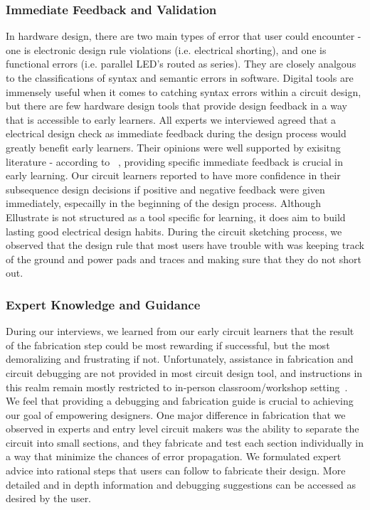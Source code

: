 \documentclass{sigchi}
\begin{document}
\subsubsection{Immediate Feedback and Validation}
In hardware design, there are two main types of error that user could encounter - one is electronic design rule violations (i.e. electrical shorting), and one is functional errors (i.e. parallel LED's routed as series). They are closely analgous to the classifications of syntax and semantic errors in software. Digital tools are immensely useful when it comes to catching syntax errors within a circuit design, but there are few hardware design tools that provide design feedback in a way that is accessible to early learners. All experts we interviewed agreed that a electrical design check as immediate feedback during the design process would greatly benefit early learners. Their opinions were well supported by exisitng literature - according to ~\cite{Hattie:2007gi,Epstein:2002ur}, providing specific immediate feedback is crucial in early learning. Our circuit learners reported to have more confidence in their subsequence design decisions if positive and negative feedback were given immediately, especailly in the beginning of the design process. Although Ellustrate is not structured as a tool specific for learning, it does aim to build lasting good electrical design habits. During the circuit sketching process, we observed that the design rule that most users have trouble with was keeping track of the ground and power pads and traces and making sure that they do not short out. 

\subsubsection{Expert Knowledge and Guidance}
During our interviews, we learned from our early circuit learners that the result of the fabrication step could be most rewarding if successful, but the most demoralizing and frustrating if not. Unfortunately, assistance in fabrication and circuit debugging are not provided in most circuit design tool, and instructions in this realm remain mostly restricted to in-person classroom/workshop setting~\cite{Klemmer:2004ul}. We feel that providing a debugging and fabrication guide is crucial to achieving our goal of empowering designers. One major difference in fabrication that we observed in experts and entry level circuit makers was the ability to separate the circuit into small sections, and they fabricate and test each section individually in a way that minimize the chances of error propagation. We formulated expert advice into rational steps that users can follow to fabricate their design. More detailed and in depth information and debugging suggestions can be accessed as desired by the user.  
\end{document}
